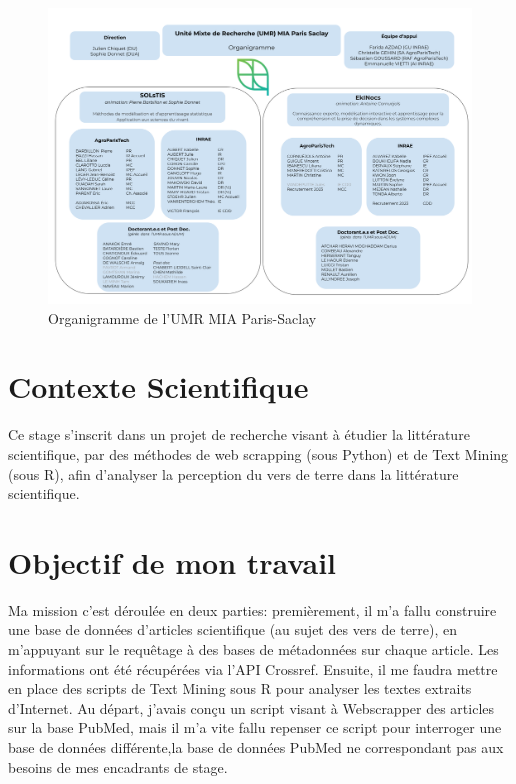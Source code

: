 \documentclass{book}
\begin{document}
\begin{figure}[h] %
    \begin{center} %
        \includegraphics[width=16cm]{organigrammeEquipe.png}
        \caption{Organigramme de l'UMR MIA Paris-Saclay}
    \end{center}
\end{figure}

\lipsum[1-2]

\thispagestyle{fancy}

\section{Contexte Scientifique}

\noindent
Ce stage s'inscrit dans un projet de recherche visant à étudier la littérature
scientifique, par des méthodes de web scrapping (sous Python) et de Text Mining
(sous R), afin d'analyser la perception du vers de terre dans la littérature
scientifique.

\lipsum[1-4]

\section{Objectif de mon travail}

\noindent
Ma mission c'est déroulée en deux parties: premièrement, il m'a fallu
construire une base de données d'articles scientifique (au sujet des vers de
terre), en m'appuyant sur le requêtage à des bases de métadonnées sur chaque
article. Les informations ont été récupérées via l'API Crossref.
Ensuite, il me faudra mettre en place des scripts de Text Mining sous R pour
analyser les textes extraits d'Internet.
Au départ, j'avais conçu un script visant à Webscrapper des articles sur la
base PubMed, mais il m'a vite fallu repenser ce script pour interroger une base
de données différente,la base de données PubMed ne correspondant pas aux
besoins de mes encadrants de stage.
\end{document}
